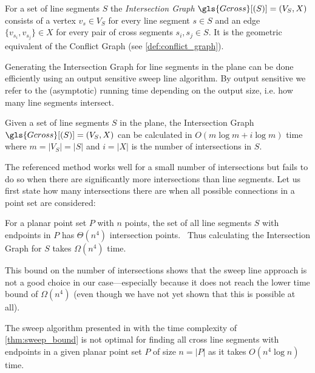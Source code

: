 \begin{definition}
  \label{def:intersection_graph}
  For a set of line segments \(S\) the
  \emph{Intersection Graph} \(\gls{Gcross}[(S)] = (V_S,X)\) consists
  of a vertex \(v_s \in V_S\) for every line segment \(s \in S\)
  and an edge \(\{v_{s_i}, v_{s_j}\} \in X\)
  for every pair of \gls{cross} segments \(s_i, s_j \in S\).
  It is the geometric equivalent of the Conflict Graph
  (see \cref{def:conflict_graph}).
\end{definition}

Generating the Intersection Graph for line segments in the plane can
be done efficiently using an output sensitive sweep line algorithm.
By output sensitive we refer to the (asymptotic) running time
depending on the output size, i.e. how many line segments intersect.

\begin{theorem}
  \label{thm:sweep_bound}
  Given a set of line segments \(S\) in the plane,
  the Intersection Graph \(\gls{Gcross}[(S)] = (V_S,X)\)
  can be calculated in \(O(m \log m + i \log m)\) time
  where \(m = |V_S| = |S|\)
  and \(i = |X|\) is the number of intersections in \(S\).
  \cite[Lemma 2.3]{deberg_compgeom}
\end{theorem}

The referenced method works well for a small number of
intersections but fails to do so when there are significantly more
intersections than line segments. Let us first state how many
intersections there are when all possible connections in a point set
are considered:

\begin{theorem}
  \label{thm:point_set_intersections}
  For a planar point set \(P\) with \(n\) points,
  the set of all line segments \(S\) with endpoints in \(P\)
  has \(\Theta(n^4)\) intersection points.~\cite{quadrilaterals_bound}
  Thus calculating the Intersection Graph for \(S\)
  takes \(\Omega(n^4)\) time.
\end{theorem}

This bound on the number of intersections shows that the sweep line
approach is not a good choice in our case---especially because it does
not reach the lower time bound of \(\Omega(n^4)\) (even though we have
not yet shown that this is possible at all).

\begin{theorem}
  The sweep algorithm presented in \cite[Section 2.1]{deberg_compgeom}
  with the time complexity of \cref{thm:sweep_bound}
  is not optimal for finding
  all \gls{cross} line segments with endpoints in a given
  planar point set \(P\) of size \(n=|P|\)
  as it takes \(O(n^4 \log n)\) time.
\end{theorem}

